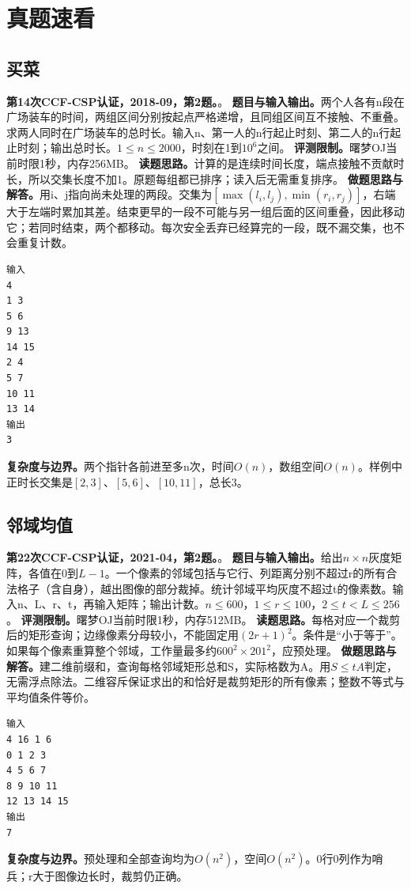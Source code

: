 \section{真题速看}
\subsection{买菜}
\textbf{第14次CCF-CSP认证，2018-09，第2题。}。
\textbf{题目与输入输出。}两个人各有n段在广场装车的时间，两组区间分别按起点严格递增，且同组区间互不接触、不重叠。求两人同时在广场装车的总时长。输入n、第一人的n行起止时刻、第二人的n行起止时刻；输出总时长。$1\le n\le2000$，时刻在1到$10^6$之间。
\textbf{评测限制。}曙梦OJ当前时限1秒，内存256MB。
\textbf{读题思路。}计算的是连续时间长度，端点接触不贡献时长，所以交集长度不加1。原题每组都已排序；读入后无需重复排序。
\textbf{做题思路与解答。}用i、j指向尚未处理的两段。交集为$[\max(l_i,l_j),\min(r_i,r_j)]$，右端大于左端时累加其差。结束更早的一段不可能与另一组后面的区间重叠，因此移动它；若同时结束，两个都移动。每次安全丢弃已经算完的一段，既不漏交集，也不会重复计数。
\begin{verbatim}
输入
4
1 3
5 6
9 13
14 15
2 4
5 7
10 11
13 14
输出
3
\end{verbatim}
\textbf{复杂度与边界。}两个指针各前进至多n次，时间$O(n)$，数组空间$O(n)$。样例中正时长交集是$[2,3]$、$[5,6]$、$[10,11]$，总长3。
\subsection{邻域均值}
\textbf{第22次CCF-CSP认证，2021-04，第2题。}。
\textbf{题目与输入输出。}给出$n\times n$灰度矩阵，各值在0到$L-1$。一个像素的邻域包括与它行、列距离分别不超过r的所有合法格子（含自身），越出图像的部分裁掉。统计邻域平均灰度不超过t的像素数。输入n、L、r、t，再输入矩阵；输出计数。$n\le600$，$1\le r\le100$，$2\le t<L\le256$。
\textbf{评测限制。}曙梦OJ当前时限1秒，内存512MB。
\textbf{读题思路。}每格对应一个裁剪后的矩形查询；边缘像素分母较小，不能固定用$(2r+1)^2$。条件是“小于等于”。如果每个像素重算整个邻域，工作量最多约$600^2\times201^2$，应预处理。
\textbf{做题思路与解答。}建二维前缀和，查询每格邻域矩形总和S，实际格数为A。用$S\le tA$判定，无需浮点除法。二维容斥保证求出的和恰好是裁剪矩形的所有像素；整数不等式与平均值条件等价。
\begin{verbatim}
输入
4 16 1 6
0 1 2 3
4 5 6 7
8 9 10 11
12 13 14 15
输出
7
\end{verbatim}
\textbf{复杂度与边界。}预处理和全部查询均为$O(n^2)$，空间$O(n^2)$。0行0列作为哨兵；r大于图像边长时，裁剪仍正确。
